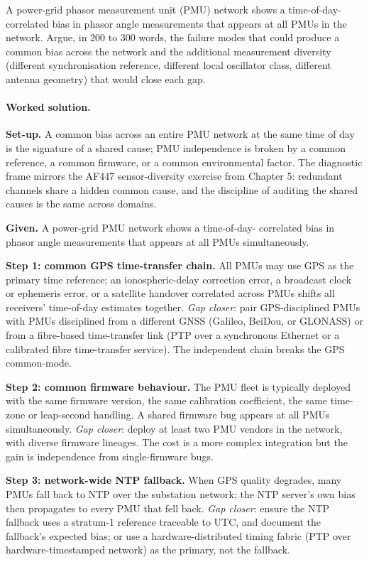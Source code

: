 \begin{exercise}
A power-grid phasor measurement unit (PMU) network shows a
time-of-day-correlated bias in phasor angle measurements that
appears at all PMUs in the network. Argue, in 200 to 300 words,
the failure modes that could produce a common bias across the
network and the additional measurement diversity (different
synchronisation reference, different local oscillator class,
different antenna geometry) that would close each gap.

\paragraph{Worked solution.}
\textbf{Set-up.} A common bias across an entire PMU network at the
same time of day is the signature of a shared cause; PMU
independence is broken by a common reference, a common firmware,
or a common environmental factor. The diagnostic frame mirrors
the AF447 sensor-diversity exercise from Chapter 5: redundant
channels share a hidden common cause, and the discipline of
auditing the shared causes is the same across domains.

\textbf{Given.} A power-grid PMU network shows a time-of-day-
correlated bias in phasor angle measurements that appears at
all PMUs simultaneously.

\textbf{Step 1: common GPS time-transfer chain.} All PMUs may use
GPS as the primary time reference; an ionospheric-delay
correction error, a broadcast clock or ephemeris error, or a
satellite handover correlated across PMUs shifts all receivers'
time-of-day estimates together.
\emph{Gap closer}: pair GPS-disciplined PMUs with PMUs disciplined
from a different GNSS (Galileo, BeiDou, or GLONASS) or from a
fibre-based time-transfer link (PTP over a synchronous Ethernet
or a calibrated fibre time-transfer service). The independent
chain breaks the GPS common-mode.

\textbf{Step 2: common firmware behaviour.} The PMU fleet is
typically deployed with the same firmware version, the same
calibration coefficient, the same time-zone or leap-second
handling. A shared firmware bug appears at all PMUs
simultaneously.
\emph{Gap closer}: deploy at least two PMU vendors in the
network, with diverse firmware lineages. The cost is a more
complex integration but the gain is independence from
single-firmware bugs.

\textbf{Step 3: network-wide NTP fallback.} When GPS quality
degrades, many PMUs fall back to NTP over the substation
network; the NTP server's own bias then propagates to every PMU
that fell back.
\emph{Gap closer}: ensure the NTP fallback uses a stratum-1
reference traceable to UTC, and document the fallback's
expected bias; or use a hardware-distributed timing fabric
(PTP over hardware-timestamped network) as the primary, not the
fallback.


\end{exercise}
